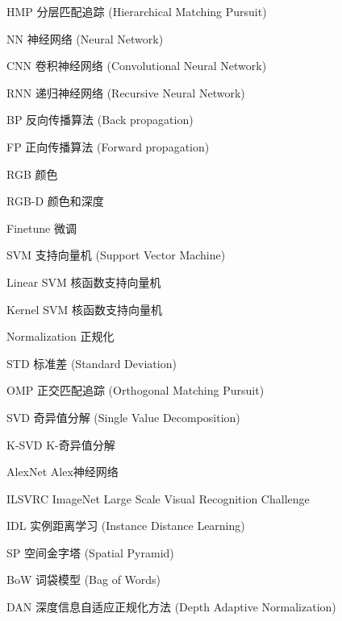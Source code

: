 \begin{denotation}[3cm]
\item[HMP] 分层匹配追踪 (Hierarchical Matching Pursuit)
\item[NN] 神经网络 (Neural Network)
\item[CNN] 卷积神经网络 (Convolutional Neural Network)
\item[RNN] 递归神经网络 (Recursive Neural Network)
\item[BP] 反向传播算法 (Back propagation)
\item[FP] 正向传播算法 (Forward propagation)
\item[RGB] 颜色
\item[RGB-D] 颜色和深度
\item[Finetune] 微调
\item[SVM] 支持向量机 (Support Vector Machine)
\item[Linear SVM] 核函数支持向量机
\item[Kernel SVM] 核函数支持向量机
\item[Normalization] 正规化
\item[STD] 标准差 (Standard Deviation)
\item[OMP] 正交匹配追踪 (Orthogonal Matching Pursuit)
\item[SVD] 奇异值分解 (Single Value Decomposition)
\item[K-SVD] K-奇异值分解
\item[AlexNet] Alex神经网络
\item[ILSVRC] ImageNet Large Scale Visual Recognition Challenge
\item[IDL] 实例距离学习 (Instance Distance Learning)
\item[SP] 空间金字塔 (Spatial Pyramid)
\item[BoW] 词袋模型 (Bag of Words)
\item[DAN] 深度信息自适应正规化方法 (Depth Adaptive Normalization)
\end{denotation}
